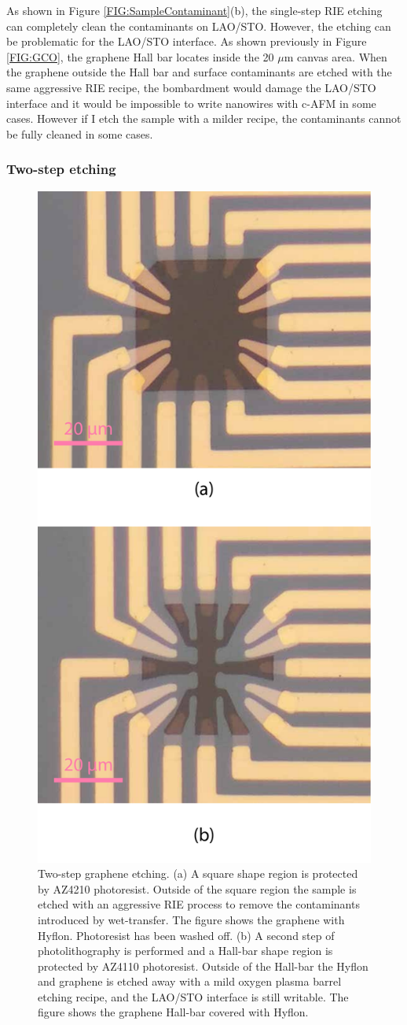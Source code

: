 \documentclass[pdflatex, sectionletters, 12pt]{pittetd}    %
\begin{document}
As shown in Figure \ref{FIG:SampleContaminant}(b), the single-step RIE etching can completely clean the contaminants on LAO/STO. However, the etching can be problematic for the LAO/STO interface. As shown previously in Figure \ref{FIG:GCO}, the graphene Hall bar locates inside the 20 $\mu$m canvas area. When the graphene outside the Hall bar and surface contaminants are etched with the same aggressive RIE recipe, the bombardment would damage the LAO/STO interface and it would be impossible to write nanowires with c-AFM in some cases. However if I etch the sample with a milder recipe, the contaminants cannot be fully cleaned in some cases. 

\subsubsection{Two-step etching}

\begin{figure}[p]
	\centering
	\includegraphics[width=.5\textwidth]{Drawing/RIETwoStep.pdf}
	\caption{Two-step graphene etching. (a) A square shape region is protected by AZ4210 photoresist. Outside of the square region the sample is etched with an aggressive RIE process to remove the contaminants introduced by wet-transfer. The figure shows the graphene with Hyflon. Photoresist has been washed off. (b) A second step of photolithography is performed and a Hall-bar shape region is protected by AZ4110 photoresist. Outside of the Hall-bar the Hyflon and graphene is etched away with a mild oxygen plasma barrel etching recipe, and the LAO/STO interface is still writable. The figure shows the graphene Hall-bar covered with Hyflon. }
	\label{FIG:RIETwoStep}
\end{figure}
\end{document}
